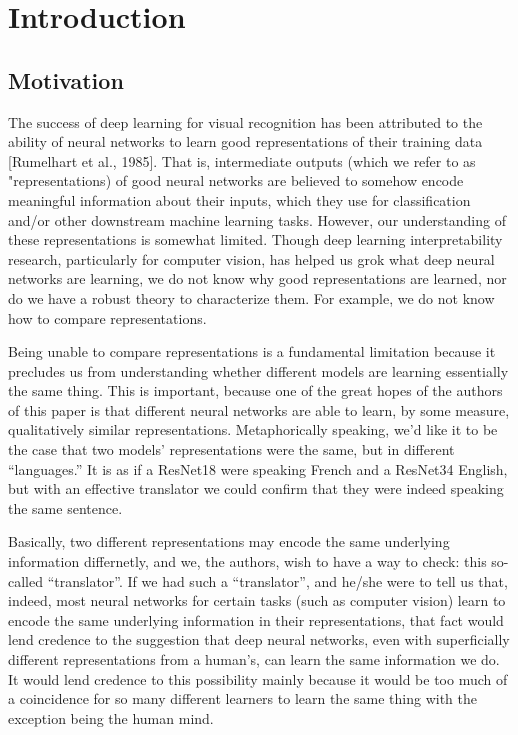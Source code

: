 \documentclass{article} %
\begin{document}
\section*{Introduction}
\subsection*{Motivation}
The success of deep learning for visual recognition has been attributed to the ability of neural networks to learn
good representations of their training data [Rumelhart et al., 1985]. That is, intermediate outputs (which we refer
to as "representations) of good neural networks 
are believed to somehow encode meaningful information about their inputs, which they use for classification and/or other
downstream machine learning tasks. However, our understanding of these representations is somewhat limited. Though
deep learning interpretability research, particularly for computer vision, has helped us grok what deep neural 
networks are learning, we do not
know why good representations are learned, nor do we have a robust theory to characterize them. For example, we do not
know how to compare representations.

Being unable to compare representations is a fundamental limitation because it precludes us from understanding whether
different models are learning essentially the same thing. This is important, because one of the great hopes of the authors
of this paper is that
different neural networks are able to learn, by some measure, qualitatively similar representations. Metaphorically speaking,
we'd like it to be the case that two models' representations were the same, but in different ``languages.'' It is as if
a ResNet18 were speaking French and a ResNet34 English, but with an effective translator we could confirm that they were
indeed speaking the same sentence.

Basically, two different representations may encode the same underlying information differnetly, and we, the authors,
wish to have a way to check: this so-called ``translator''. If we had such a ``translator'', and he/she were to tell
us that, indeed, most neural networks for certain tasks (such as computer vision) learn to encode the same
underlying information in their representations, that fact would lend credence to the suggestion that deep neural
networks, even with superficially different representations from a human's, can learn the same information we do.
It would
lend credence to this possibility mainly because it would be too much of a coincidence for so many different learners
to learn the same thing with the exception being the human mind.
\end{document}
